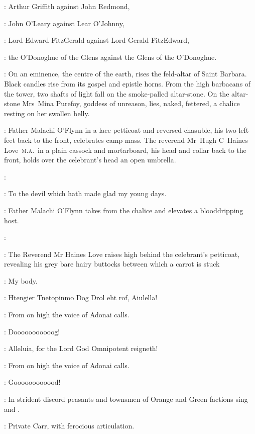 :
Arthur Griffith against John Redmond,

:
John O'Leary against Lear O'Johnny,

:
Lord Edward FitzGerald against Lord Gerald FitzEdward,

:
the O'Donoghue of the Glens against the Glens of the O'Donoghue.

:
On an eminence, the centre of the earth, rises the feld-altar of Saint Barbara.
Black candles rise from its gospel and epistle horns.
From the high barbacans of the tower,
two shafts of light fall on the smoke-palled altar-stone.
On the altar-stone Mrs~Mina Purefoy, goddess of unreason, lies,
naked, fettered, a chalice resting on her swollen belly.

:
Father Malachi O'Flynn in a lace petticoat and reversed chasuble,
his two left feet back to the front, celebrates camp mass.
The reverend Mr~Hugh C~Haines Love~\textsc{m.a.}\ 
in a plain cassock and mortarboard,
his head and collar back to the front,
holds over the celebrant's head an open umbrella.

\FrMalachiOFlynn[1]:

\HainesLove[2]:
To the devil which hath made glad my young days.

:
Father Malachi O'Flynn takes from the chalice and elevates a blooddripping host.

\FrMalachiOFlynn:

:
The Reverend Mr Haines Love raises high behind the celebrant's petticoat,
revealing his grey bare hairy buttocks between which a carrot is stuck

\HainesLove:
My body.

\VoiceAllDamned[2]:
Htengier Tnetopinmo Dog Drol eht rof,
Aiulella!

:
From on high the voice of Adonai calls.

\Adonai:
Dooooooooooog!

\VoiceAllBlessed[1]:
Alleluia, for the Lord God Omnipotent reigneth!

:
From on high the voice of Adonai calls.

\Adonai:
Goooooooooood!

:
In strident discord peasants and townsmen of Orange and Green factions
sing \Title{Kick the Pope} and \Title{Daily, daily sing to Mary}.

:
Private Carr, with ferocious articulation.

